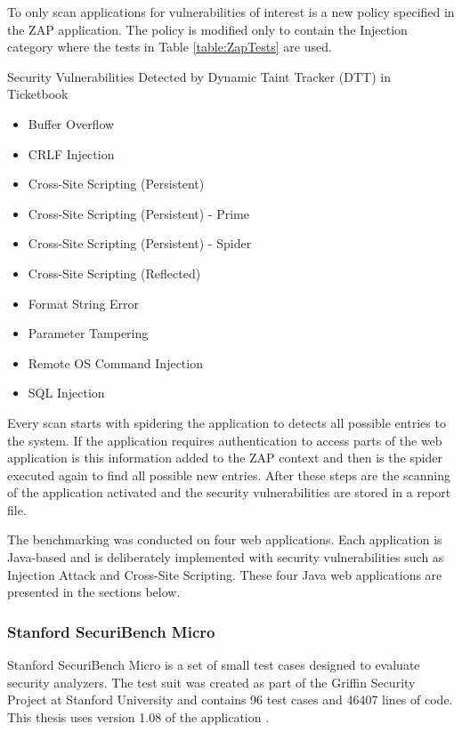To only scan applications for vulnerabilities of interest is a new policy specified in the ZAP application. The policy is modified only to contain the Injection category where the tests in Table \ref{table:ZapTests} are used.

\begin{table}[H]
  \centering
  \caption{Security Vulnerabilities Detected by Dynamic Taint Tracker (DTT) in Ticketbook}
    \label{table:ZapTests}
    \begin{itemize}
        \item Buffer Overflow
        \item CRLF Injection
        \item Cross-Site Scripting (Persistent)
        \item Cross-Site Scripting (Persistent) - Prime
        \item Cross-Site Scripting (Persistent) - Spider
        \item Cross-Site Scripting (Reflected)
        \item Format String Error
        \item Parameter Tampering
        \item Remote OS Command Injection
        \item SQL Injection
    \end{itemize}
\end{table}

Every scan starts with spidering the application to detects all possible entries to the system. If the application requires authentication to access parts of the web application is this information added to the ZAP context and then is the spider executed again to find all possible new entries. After these steps are the scanning of the application activated and the security vulnerabilities are stored in a report file. 

The benchmarking was conducted on four web applications. Each application is Java-based and is deliberately implemented with security vulnerabilities such as Injection Attack and Cross-Site Scripting. These four Java web applications are presented in the sections below.



\subsubsection{Stanford SecuriBench Micro}
Stanford SecuriBench Micro is a set of small test cases designed to evaluate security analyzers. The test suit was created as part of the Griffin Security Project \parencite{griffin} at Stanford University and contains 96 test cases and 46407 lines of code. This thesis uses version 1.08 of the application \parencite{securiBenchMicro, microfaq}. 



